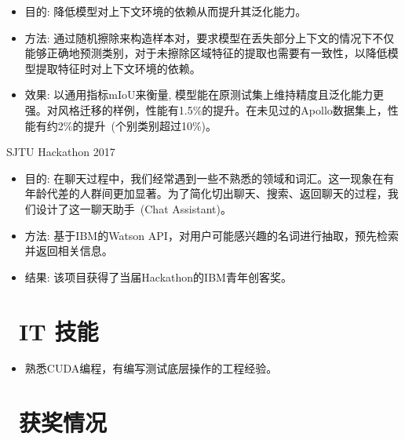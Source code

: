 \documentclass{resume}
\begin{document}
	 {}
	\begin{itemize}
		\item 目的: 降低模型对上下文环境的依赖从而提升其泛化能力。
		\item 方法: 通过随机擦除来构造样本对，要求模型在丢失部分上下文的情况下不仅能够正确地预测类别，对于未擦除区域特征的提取也需要有一致性，以降低模型提取特征时对上下文环境的依赖。
		\item 效果: 以通用指标mIoU来衡量, 模型能在原测试集上维持精度且泛化能力更强。对风格迁移的样例，性能有1.5\%的提升。在未见过的Apollo数据集上，性能有约2\%的提升~(个别类别超过10\%)。
	\end{itemize}

	 {SJTU Hackathon 2017}
	\begin{itemize}
		\item{目的: 在聊天过程中，我们经常遇到一些不熟悉的领域和词汇。这一现象在有年龄代差的人群间更加显著。为了简化切出聊天、搜索、返回聊天的过程，我们设计了这一聊天助手~(Chat Assistant)。}
		\item 方法: 基于IBM的Watson API，对用户可能感兴趣的名词进行抽取，预先检索并返回相关信息。
		\item 结果: 该项目获得了当届Hackathon的IBM青年创客奖。	
	\end{itemize}
	
	\section{\faCogs\ IT 技能}
	\begin{itemize}[parsep=0.5ex]
		\item 熟悉CUDA编程，有编写测试底层操作的工程经验。
	\end{itemize}
	
	\section{\faHeartO\ 获奖情况}
	
	
\end{document}
